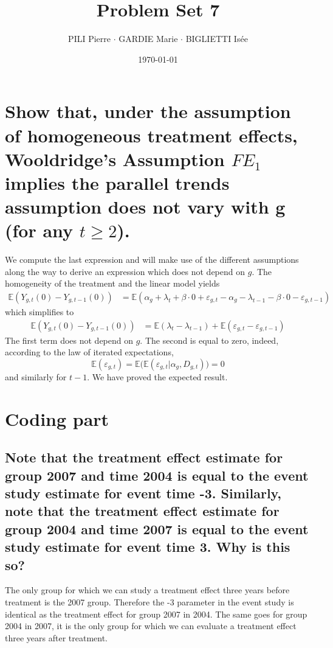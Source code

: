 \documentclass[12pt]{article}
\title{Problem Set 7}
\author{PILI Pierre $\cdot$ GARDIE Marie $\cdot$ BIGLIETTI Isée}
\date{\today}
\renewcommand{\thesubsection}{\arabic{section}.\arabic{subsection}}
\begin{document}
\maketitle
\renewcommand{\thesubsection}{\alph{subsection}}

\section{Show that, under the assumption of homogeneous treatment effects, Wooldridge’s Assumption $FE_1$ implies the parallel trends assumption does not vary with g (for any $t \geq 2$).}
We compute the last expression and will make use of the different assumptions along the way to derive an expression which does not depend on $g$. The homogeneity of the treatment and the linear model yields
\begin{align*}
    \mathbb{E}\left(Y_{g, t}(0) - Y_{g, t-1}(0)\right) &= \mathbb{E}\left(\alpha_g + \lambda_t + \beta \cdot  0 + \varepsilon_{g, t} - \alpha_g - \lambda_{t-1} - \beta \cdot 0 - \varepsilon_{g, t-1}\right) 
\end{align*}
which simplifies to
\begin{align*}
    \mathbb{E}\left(Y_{g, t}(0) - Y_{g, t-1}(0)\right) &= \mathbb{E}\left(\lambda_t - \lambda_{t-1}\right)  + \mathbb{E}\left(\varepsilon_{g, t} - \varepsilon_{g, t-1}\right) 
\end{align*}
The first term does not depend on $g$. The second is equal to zero, indeed, according to the law of iterated expectations,
$$\mathbb{E}\left(\varepsilon_{g, t}\right) = \mathbb{E}\big(\mathbb{E}(\varepsilon_{g, t}|\alpha_g, D_{g, t})\big) = 0$$
and similarly for $t-1$. We have proved the expected result.
\setcounter{section}{2}
\section{Coding part}
\subsection{Note that the treatment effect estimate for group 2007 and time 2004 is equal to the event study estimate for event time -3. Similarly, note that the treatment effect estimate for group 2004 and time 2007 is equal to the event study estimate for event time 3. Why is this so?}
The only group for which we can study a treatment effect three years before treatment is the 2007 group. Therefore the -3 parameter in the event study is identical as the treatment effect for group 2007 in 2004. The same goes for group 2004 in 2007, it is the only group for which we can evaluate a treatment effect three years after treatment.
\end{document}
